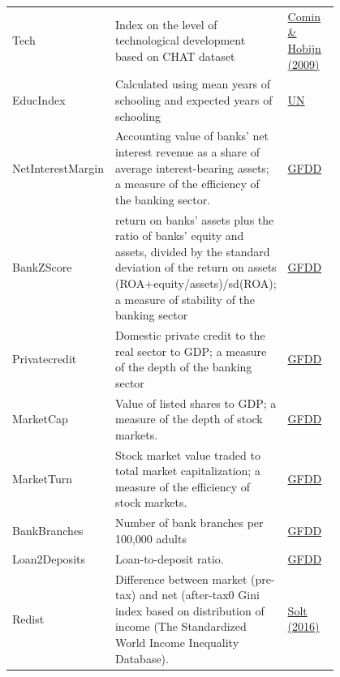 \documentclass[a4paper,11pt]{article}
\begin{document}
\begin{center}
\begin{longtable}{l p{0.50\linewidth} p{0.3\linewidth}}
			Tech & Index on the level of technological development based on CHAT dataset & \href{http://www.nber.org/data/chat/}{Comin \& Hobijn (2009)} \\
			
			EducIndex & Calculated using mean years of schooling and expected years of schooling & \href{http://hdr.undp.org/en/content/education-index}{UN} \\
			
			NetInterestMargin & Accounting value of banks' net interest revenue as a share of average interest-bearing assets; a measure of the efficiency of the banking sector. & \href{http://data.worldbank.org/data-catalog/global-financial-development}{GFDD} \\
			
			BankZScore & return on banks' assets plus the ratio of banks' equity and assets, divided
			by the standard deviation of the return on assets (ROA+equity/assets)/sd(ROA); a measure of stability of the banking sector & \href{http://data.worldbank.org/data-catalog/global-financial-development}{GFDD} \\
			
			Privatecredit & Domestic private credit to the real sector to GDP; a measure of the depth of the banking sector & \href{http://data.worldbank.org/data-catalog/global-financial-development}{GFDD} \\
			
			MarketCap & Value of listed shares to GDP; a measure of the
			depth of stock markets.& \href{http://data.worldbank.org/data-catalog/global-financial-development}{GFDD} \\
			
			MarketTurn & Stock market value traded to total market capitalization; a measure of the efficiency of stock markets. & \href{http://data.worldbank.org/data-catalog/global-financial-development}{GFDD} \\
			
			BankBranches & Number of bank branches per 100,000 adults & \href{http://data.worldbank.org/data-catalog/global-financial-development}{GFDD} \\
			
			Loan2Deposits & Loan-to-deposit ratio. & \href{http://data.worldbank.org/data-catalog/global-financial-development}{GFDD} \\
			
			Redist & Difference between market (pre-tax) and net (after-tax0 Gini index based on distribution of income  (The Standardized World Income Inequality Database). & \href{http://fsolt.org/swiid/}{Solt (2016)} \\	
			

\end{longtable}
\end{center}
\end{document}
